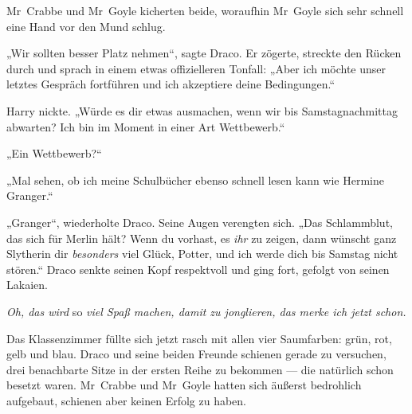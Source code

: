 Mr~Crabbe und Mr~Goyle kicherten beide, woraufhin Mr~Goyle sich sehr schnell eine Hand vor den Mund schlug.

„Wir sollten besser Platz nehmen“, sagte Draco. Er zögerte, streckte den Rücken durch und sprach in einem etwas offizielleren Tonfall:
„Aber ich möchte unser letztes Gespräch fortführen und ich akzeptiere deine Bedingungen.“

Harry nickte.
„Würde es dir etwas ausmachen, wenn wir bis Samstagnachmittag abwarten? Ich bin im Moment in einer Art Wettbewerb.“

„Ein Wettbewerb?“

„Mal sehen, ob ich meine Schulbücher ebenso schnell lesen kann wie Hermine Granger.“

„Granger“, wiederholte Draco. Seine Augen verengten sich.
„Das Schlammblut, das sich für Merlin hält? Wenn du vorhast, es \emph{ihr} zu zeigen, dann wünscht ganz Slytherin dir \emph{besonders} viel Glück, Potter, und ich werde dich bis Samstag nicht stören.“ Draco senkte seinen Kopf respektvoll und ging fort, gefolgt von seinen Lakaien.

\emph{Oh, das wird} so \emph{viel Spaß machen, damit zu jonglieren, das merke ich jetzt schon.}

Das Klassenzimmer füllte sich jetzt rasch mit allen vier Saumfarben: grün, rot, gelb und blau. Draco und seine beiden Freunde schienen gerade zu versuchen, drei benachbarte Sitze in der ersten Reihe zu bekommen — die natürlich schon besetzt waren. Mr~Crabbe und Mr~Goyle hatten sich äußerst bedrohlich aufgebaut, schienen aber keinen Erfolg zu haben.

